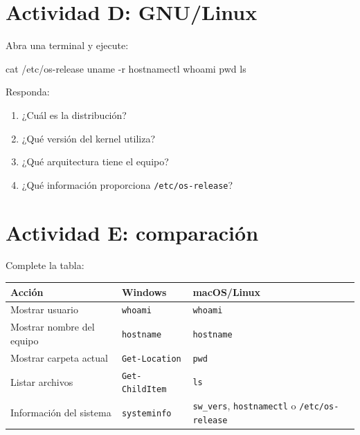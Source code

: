 \documentclass[
  spanish,
  letterpaper,
]{scrbook}
\newenvironment{Shaded}{\begin{snugshade}}{\end{snugshade}}
\newcommand{\AttributeTok}[1]{\textcolor[rgb]{0.40,0.45,0.13}{#1}}
\newcommand{\BuiltInTok}[1]{\textcolor[rgb]{0.00,0.23,0.31}{#1}}
\newcommand{\ExtensionTok}[1]{\textcolor[rgb]{0.00,0.23,0.31}{#1}}
\newcommand{\FunctionTok}[1]{\textcolor[rgb]{0.28,0.35,0.67}{#1}}
\newcommand{\NormalTok}[1]{\textcolor[rgb]{0.00,0.23,0.31}{#1}}
\newcounter{none} %
\providecommand{\tightlist}{%
  \setlength{\itemsep}{0pt}\setlength{\parskip}{0pt}}
\begin{document}
\section{Actividad D: GNU/Linux}\label{actividad-d-gnulinux}

Abra una terminal y ejecute:

\begin{Shaded}
\begin{Highlighting}[]
\FunctionTok{cat}\NormalTok{ /etc/os{-}release}
\FunctionTok{uname} \AttributeTok{{-}r}
\ExtensionTok{hostnamectl}
\FunctionTok{whoami}
\BuiltInTok{pwd}
\FunctionTok{ls}
\end{Highlighting}
\end{Shaded}

Responda:

\begin{enumerate}
\def\labelenumi{\arabic{enumi}.}
\tightlist
\item
  ¿Cuál es la distribución?
\item
  ¿Qué versión del kernel utiliza?
\item
  ¿Qué arquitectura tiene el equipo?
\item
  ¿Qué información proporciona \texttt{/etc/os-release}?
\end{enumerate}

\section{Actividad E: comparación}\label{actividad-e-comparaciuxf3n}

Complete la tabla:

{\def\LTcaptype{none} %
\begin{longtable}[]{@{}
  >{\raggedright\arraybackslash}p{}
  >{\raggedright\arraybackslash}p{}
  >{\raggedright\arraybackslash}p{}@{}}
\toprule\noalign{}
\begin{minipage}[b]{\linewidth}\raggedright
Acción
\end{minipage} & \begin{minipage}[b]{\linewidth}\raggedright
Windows
\end{minipage} & \begin{minipage}[b]{\linewidth}\raggedright
macOS/Linux
\end{minipage} \\
\midrule\noalign{}
\endhead
\bottomrule\noalign{}
\endlastfoot
Mostrar usuario & \texttt{whoami} & \texttt{whoami} \\
Mostrar nombre del equipo & \texttt{hostname} & \texttt{hostname} \\
Mostrar carpeta actual & \texttt{Get-Location} & \texttt{pwd} \\
Listar archivos & \texttt{Get-ChildItem} & \texttt{ls} \\
Información del sistema & \texttt{systeminfo} & \texttt{sw\_vers},
\texttt{hostnamectl} o \texttt{/etc/os-release} \\
\end{longtable}
}
\end{document}
